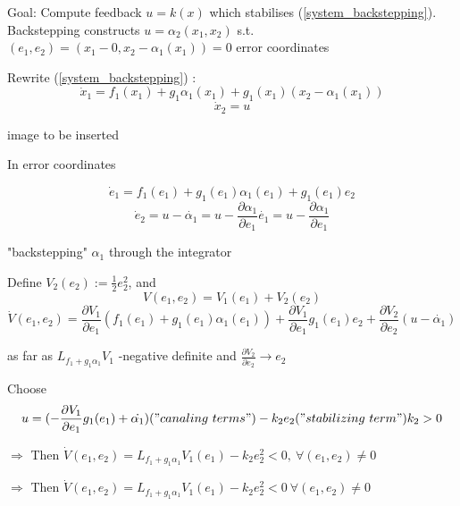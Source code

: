 Goal: Compute feedback $u = k(x)$ which stabilises (\ref{system_backstepping}). Backstepping constructs $u = \alpha_2(x_1, x_2)$ s.t. $(e_1, e_2) = (x_1 - 0, x_2 - \alpha_1(x_1))=0$ error coordinates

Rewrite (\ref{system_backstepping}) :
\begin{equation*}
\dot x_1 = f_1(x_1) + g_1\alpha_1(x_1) + g_1(x_1)(x_2 - \alpha_1(x_1))
\end{equation*}  
\begin{equation*}
\dot x_2 = u
\end{equation*}

image to be inserted

In error coordinates

\begin{equation}\label{error_coordinates_rewriting}
\dot e_1 = f_1(e_1) + g_1(e_1)\alpha_1(e_1) +g_1(e_1)e_2
\end{equation}
\begin{equation*}
\dot e_2 = u - \dot{\alpha_1} = u - \frac{\partial \alpha_1}{\partial e_1}\dot{e_1} = u - \frac{\partial \alpha_1}{\partial e_1}
\end{equation*}

"backstepping" $\alpha_1$ through the integrator

Define $V_2(e_2):= \frac{1}{2} e_2^2$, and 
\begin{equation*}
V(e_1, e_2) = V_1(e_1) + V_2(e_2)
\end{equation*}  
\begin{equation*}
\dot V(e_1, e_2) = \frac{\partial V_1}{\partial e_1}(f_1(e_1) + g_1(e_1)\alpha_1(e_1)) + \frac{\partial V_1}{\partial e_1}g_1(e_1)e_2 + \frac{\partial V_2}{\partial e_2}(u - \dot{\alpha_1})
\end{equation*}

as far as $L_{f_1 + g_1\alpha_1}V_1$ -negative definite and $\frac{\partial V_2}{\partial e_2} \rightarrow e_2$

Choose 
\begin{equation}\label{u_choice}
u = (- \frac{\partial V_1}{\partial e_1}g_1(e_1) + \dot{\alpha_1})("canaling\ terms") - k_2e_2 ("stabilizing\ term") k_2 > 0
\end{equation}

$\Rightarrow$ Then $\dot{V}(e_1, e_2) = L_{f_1 + g_1\alpha_1}V_1(e_1) - k_2e_2^2 < 0, \ \forall (e_1, e_2) \neq 0$

$\Rightarrow$ Then $\dot V (e_1, e_2) = L_{f_1 + g_1\alpha_1}V_1(e_1) - k_2e_2^2 < 0 \ \forall (e_1, e_2) \neq 0$

